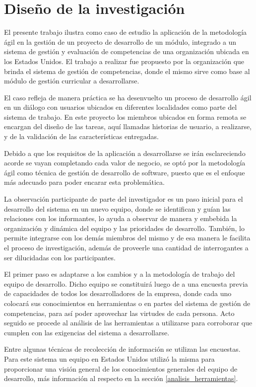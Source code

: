\section{Diseño de la investigación}
El presente trabajo ilustra como caso de estudio la aplicación de la metodología ágil en la gestión de un proyecto de desarrollo de un módulo, integrado a un sistema de gestión y evaluación de competencias de una organización ubicada en los Estados Unidos. El trabajo a realizar fue propuesto por la organización que brinda el sistema de gestión de competencias, donde el mismo sirve como base al módulo de gestión curricular a desarrollarse.

El caso refleja de manera práctica se ha desenvuelto un proceso de desarrollo ágil en un diálogo con usuarios ubicados en diferentes localidades como parte del sistema de trabajo. En este proyecto los miembros ubicados en forma remota se encargan del diseño de las tareas, aquí llamadas historias de usuario, a realizarse, y de la validación de las características entregadas.

Debido a que los requisitos de la aplicación a desarrollarse se irán esclareciendo acorde se vayan completando cada valor de negocio, se optó por la metodología ágil como técnica de gestión de desarrollo de software, puesto que es el enfoque más adecuado para poder encarar esta problemática.

La observación participante de parte del investigador es un paso inicial para el desarrollo del sistema en un nuevo equipo, donde se identifican y guían las relaciones con los informantes, lo ayuda a observar de manera y embebida la organización y dinámica del equipo y las prioridades de desarrollo. También, lo permite integrarse con los demás miembros del mismo y de esa manera le facilita el proceso de investigación, además de proveerle una cantidad de interrogantes a ser dilucidadas con los participantes\citep{erlandson_doing_1993}.

El primer paso es adaptarse a los cambios y a la metodología de trabajo del equipo de desarrollo. Dicho equipo se constituirá luego de a una encuesta previa de capacidades de todos los desarrolladores de la empresa, donde cada uno colocará sus conocimientos en herramientas o en partes del sistema de gestión de competencias, para así poder aprovechar las virtudes de cada persona. Acto seguido se procede al análisis de las herramientas a utilizarse para corroborar que cumplen con las exigencias del sistema a desarrollarse.

Entre algunas técnicas de recolección de información se utilizan las encuestas\citep{robson_real_2011}. Para este sistema un equipo en Estados Unidos utilizó la misma para proporcionar una visión general de los conocimientos generales del equipo de desarrollo, más información al respecto en la sección \ref{analisis_herramientas}.

